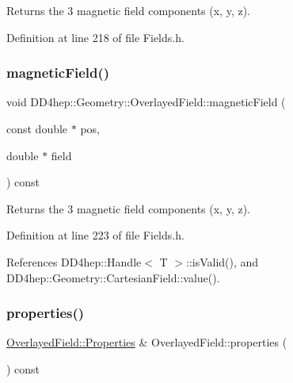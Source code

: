 Returns the 3 magnetic field components (x, y, z). 



Definition at line 218 of file Fields.\+h.

\hypertarget{class_d_d4hep_1_1_geometry_1_1_overlayed_field_ad7d30b090019e3147927dd4804a5f701}{}\label{class_d_d4hep_1_1_geometry_1_1_overlayed_field_ad7d30b090019e3147927dd4804a5f701} 
\subsubsection{\texorpdfstring{magnetic\+Field()}{magneticField()}\hspace{0.1cm}{\footnotesize\ttfamily [3/3]}}
{\footnotesize\ttfamily void D\+D4hep\+::\+Geometry\+::\+Overlayed\+Field\+::magnetic\+Field (\begin{DoxyParamCaption}\item[{const double $\ast$}]{pos,  }\item[{double $\ast$}]{field }\end{DoxyParamCaption}) const\hspace{0.3cm}{\ttfamily [inline]}}



Returns the 3 magnetic field components (x, y, z). 



Definition at line 223 of file Fields.\+h.



References D\+D4hep\+::\+Handle$<$ T $>$\+::is\+Valid(), and D\+D4hep\+::\+Geometry\+::\+Cartesian\+Field\+::value().

\hypertarget{class_d_d4hep_1_1_geometry_1_1_overlayed_field_a077f2eb70eacb81446388ef117dd32b5}{}\label{class_d_d4hep_1_1_geometry_1_1_overlayed_field_a077f2eb70eacb81446388ef117dd32b5} 
\subsubsection{\texorpdfstring{properties()}{properties()}}
{\footnotesize\ttfamily \hyperlink{class_d_d4hep_1_1_geometry_1_1_overlayed_field_acdf81fbf8e0c336cb724ee2846a2c5b0}{Overlayed\+Field\+::\+Properties} \& Overlayed\+Field\+::properties (\begin{DoxyParamCaption}{ }\end{DoxyParamCaption}) const}



